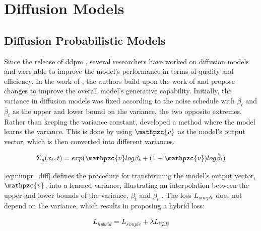 \section{Diffusion Models}
\label{ch:relatedWork-diffusionModels}

\subsection{Diffusion Probabilistic Models}
\label{ch:preliminaries-diffusionProbabilisticModelsTabularData}

Since the release of \gls{ddpm} \cite{ho2020DenoisingDiffusionProbabilistic}, several researchers have worked on diffusion models and were able to improve the model's performance in terms of quality and efficiency.
In the work of \textcite{nichol2021ImprovedDenoisingDiffusion}, the authors build upon the work of \textcite{ho2020DenoisingDiffusionProbabilistic} and propose changes to improve the overall model's generative capability.
Initially, the variance in diffusion models was fixed according to the noise schedule with $\beta_t$ and $\tilde{\beta_t}$ as the upper and lower bound on the variance, the two opposite extremes.
Rather than keeping the variance constant, \textcite{nichol2021ImprovedDenoisingDiffusion} developed a method where the model learns the variance. 
This is done by using $\mathpzc{v}$ as the model's output vector, which is then converted into different variances.

\begin{equation}
    \label{eqn:impr_diff}
    \begin{align*}
        \Sigma_{\theta}^{}(x_t,t)=exp(\mathpzc{v}log\beta_t+(1-\mathpzc{v})log\hat{\beta}_t)
    \end{align*}
\end{equation}

\autoref{eqn:impr_diff} defines the procedure for transforming the model's output vector, $\mathpzc{v}$, into a learned variance, illustrating an interpolation between the upper and lower bounds of the variance, $\beta_t$ and $\hat{\beta}_t$ \cite{nichol2021ImprovedDenoisingDiffusion}.
The loss $L_{simple}$ does not depend on the variance, which results in \cite{nichol2021ImprovedDenoisingDiffusion} proposing a hybrid loss:

\begin{equation}
    \label{eqn:l_hybrid}
    \begin{align*}
        L_{hybrid} =L_{simple}+\lambda L_{VLB}
    \end{align*}
\end{equation}

